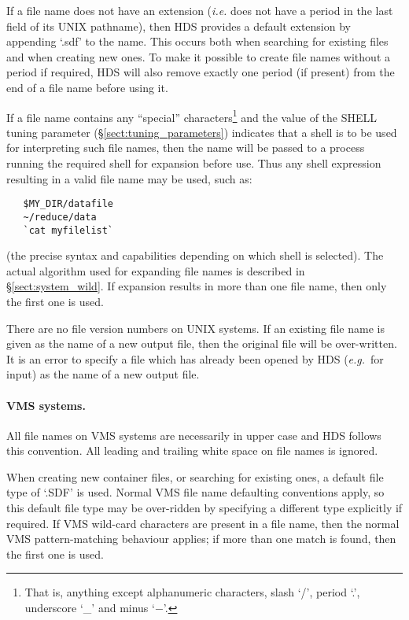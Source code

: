 If a file name does not have an extension ({\em i.e.} does not have a period in
the last field of its UNIX pathname), then HDS provides a default extension by
appending `.sdf' to the name. This occurs both when searching for existing files
and when creating new ones. To make it possible to create file names without a
period if required, HDS will also remove exactly one period (if present) from
the end of a file name before using it.

If a file name contains any ``special'' characters\footnote{That is, anything
except alphanumeric characters, slash `/', period `.', underscore `\_' and minus
`$-$'.} and the value of the SHELL tuning parameter
(\S\ref{sect:tuning_parameters}) indicates that a shell is to be used for
interpreting such file names, then the name will be passed to a process running
the required shell for expansion before use. Thus any shell expression resulting
in a valid file name may be used, such as:

\small
\begin{verbatim}
   $MY_DIR/datafile
   ~/reduce/data
   `cat myfilelist`
\end{verbatim}
\normalsize

(the precise syntax and capabilities depending on which shell is selected). The
actual algorithm used for expanding file names is described in
\S\ref{sect:system_wild}. If expansion results in more than one file name, then
only the first one is used.

There are no file version numbers on UNIX systems. If an existing file name
is given as the name of a new output file, then the original file will be
over-written. It is an error to specify a file which has already been opened
by HDS ({\em e.g.}\ for input) as the name of a new output file. 

\paragraph{VMS systems.} All file names on VMS systems are necessarily in upper
case and HDS follows this convention. All leading and trailing white space on
file names is ignored.

When creating new container files, or searching for existing ones, a default
file type of `.SDF' is used. Normal VMS file name defaulting conventions apply,
so this default file type may be over-ridden by specifying a different type
explicitly if required. If VMS wild-card characters are present in a file name,
then the normal VMS pattern-matching behaviour applies; if more than one match
is found, then the first one is used.

